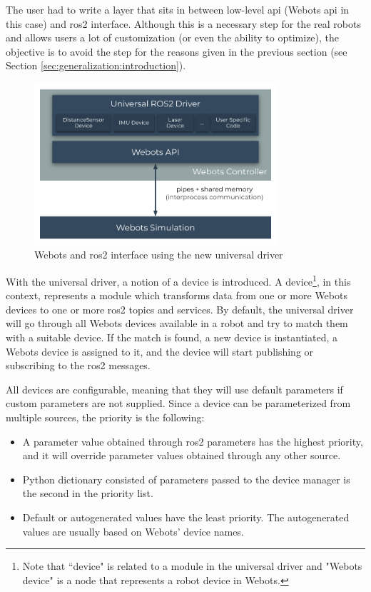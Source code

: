 The user had to write a layer that sits in between low-level \ac{api} (Webots \ac{api} in this case) and \ac{ros2} interface. 
Although this is a necessary step for the real robots and allows users a lot of customization (or even the ability to optimize), the objective is to avoid the step for the reasons given in the previous section (see Section \ref{sec:generalization:introduction}).

\begin{figure}[H]
    \centering
    \includegraphics[width=0.8\textwidth]{generalization/figures/universal_driver_within_webots.pdf}
    \caption{Webots and \ac{ros2} interface using the new universal driver}
    \label{fig:generalization:universal_driver_within_webots}
\end{figure}

With the universal driver, a notion of a device is introduced.
A device\footnote{Note that ``device" is related to a module in the universal driver and "Webots device" is a node that represents a robot device in Webots.}, in this context, represents a module which transforms data from one or more Webots devices to one or more \ac{ros2} topics and services.
By default, the universal driver will go through all Webots devices available in a robot and try to match them with a suitable device.
If the match is found, a new device is instantiated, a Webots device is assigned to it, and the device will start publishing or subscribing to the \ac{ros2} messages.

All devices are configurable, meaning that they will use default parameters if custom parameters are not supplied.
Since a device can be parameterized from multiple sources, the priority is the following:
\begin{itemize}
    \item A parameter value obtained through \ac{ros2} parameters has the highest priority, and it will override parameter values obtained through any other source.
    \item Python dictionary consisted of parameters passed to the device manager is the second in the priority list.
    \item Default or autogenerated values have the least priority. The autogenerated values are usually based on Webots' device names.
\end{itemize}

